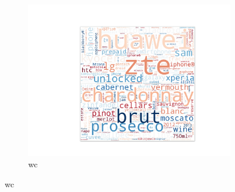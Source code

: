 \begin{figure}
\begin{subfigure}{0.2\textwidth}
   \includegraphics[width=\textwidth]{resources/wc}
   \caption{wc}
   \label{fig:Accuracy-Per-Sample}
\end{subfigure}
\end{figure}

